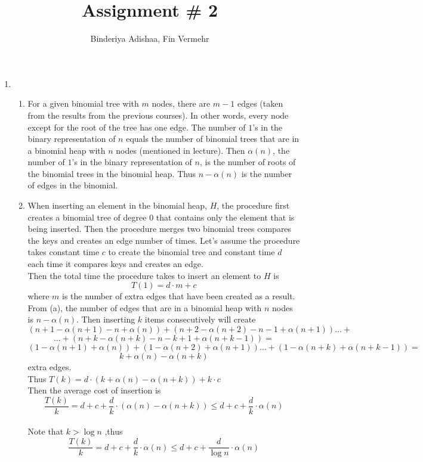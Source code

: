 \documentclass{article}
\begin{document}
\title{Assignment \# 2}
\author{Binderiya Adishaa,
Fin Vermehr}
\maketitle

 
\begin{enumerate}
\item 
    \begin{enumerate}
        \item For a given binomial tree with $m$ nodes, there are $m-1$ edges (taken from the results from the previous courses). In other words, every node except for the root of the tree has one edge. The number of $1$'s in the binary representation of $n$ equals the number of binomial trees that are in a binomial heap with $n$ nodes (mentioned in lecture). Then $\alpha(n)$, the number of $1$'s in the binary representation of $n$, is the number of roots of the binomial trees in the binomial heap. Thus $n-\alpha(n)$ is the number of edges in the binomial.
        \item When inserting an element in the binomial heap, $H$, the procedure first creates a binomial tree of degree 0 that contains only the element that is being inserted. Then the procedure merges two binomial trees compares the keys and creates an edge number of times. Let's assume the procedure takes constant time $c$ to create the binomial tree and constant time $d$ each time it compares keys and creates an edge.
        \\Then the total time the procedure takes to insert an element to $H$ is $$T(1) = d\cdot m + c$$ where $m$ is the number of extra edges that have been created as a result.
        \\ From (a), the number of edges that are in a binomial heap with $n$ nodes is $n - \alpha(n)$. Then inserting $k$ items consecutively will create 
        $$(n + 1 -\alpha(n+1) - n + \alpha(n)) + (n + 2 -\alpha(n+2) - n - 1 + \alpha(n + 1)) \dots+$$ 
        $$\dots+(n + k -\alpha(n+k) - n - k + 1 + \alpha(n + k - 1))=$$
        $$ (1 -\alpha(n+1) + \alpha(n)) + (1 -\alpha(n+2) + \alpha(n + 1)) \dots + (1 -\alpha(n+k) + \alpha(n+k-1))=$$
        $$k + \alpha(n) - \alpha(n+k)$$
        extra edges.
        \\Thus $T(k) = d \cdot (k + \alpha(n) - \alpha(n+k)) + k \cdot c$
        \\Then the average cost of insertion is $$\frac{T(k)}{k} = d + c + \frac{d}{k}\cdot(\alpha(n) - \alpha(n+k))\le d + c + \frac{d}{k}\cdot \alpha(n) $$
        \\ Note that $ k > \log n$ ,thus \\$$\frac{T(k)}{k} = d + c + \frac{d}{k}\cdot \alpha(n) \le d + c + \frac{d}{\log n}\cdot \alpha(n) $$

\end{enumerate}
\end{enumerate}
\end{document}
